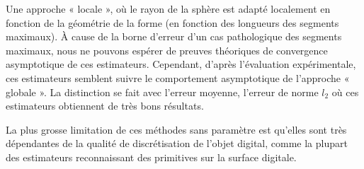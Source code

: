 Une approche « locale », où le rayon de la sphère est adapté localement en
fonction de la géométrie de la forme (en fonction des longueurs des segments
maximaux). À cause de la borne d'erreur d'un cas pathologique des segments
maximaux, nous ne pouvons espérer de preuves théoriques de convergence
asymptotique de ces estimateurs. Cependant, d'après l'évaluation expérimentale,
ces estimateurs semblent suivre le comportement asymptotique de l'approche «
globale ». La distinction se fait avec l'erreur moyenne, l'erreur de norme $l_2$
où ces estimateurs obtiennent de très bons résultats.


La plus grosse limitation de ces méthodes sans paramètre est qu'elles sont très
dépendantes de la qualité de discrétisation de l'objet digital, comme la plupart
des estimateurs reconnaissant des primitives sur la surface digitale.
